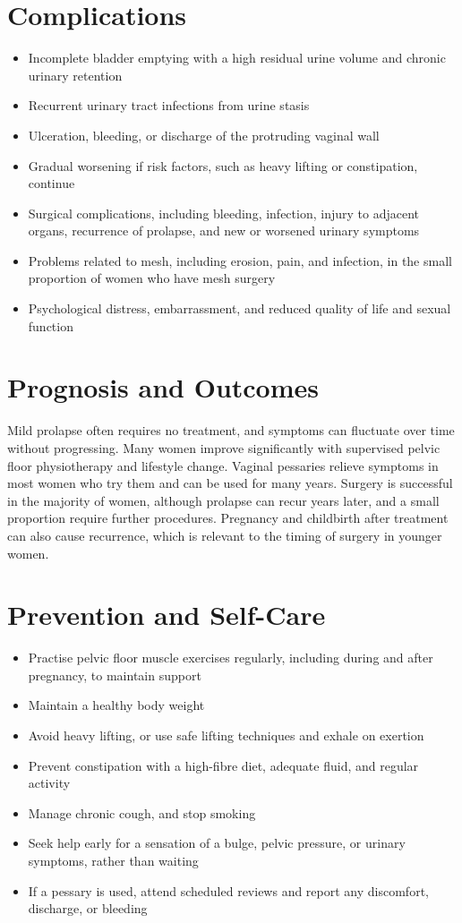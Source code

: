 \section*{Complications}
\begin{itemize}
    \item Incomplete bladder emptying with a high residual urine volume and chronic urinary retention
    \item Recurrent urinary tract infections from urine stasis
    \item Ulceration, bleeding, or discharge of the protruding vaginal wall
    \item Gradual worsening if risk factors, such as heavy lifting or constipation, continue
    \item Surgical complications, including bleeding, infection, injury to adjacent organs, recurrence of prolapse, and new or worsened urinary symptoms
    \item Problems related to mesh, including erosion, pain, and infection, in the small proportion of women who have mesh surgery
    \item Psychological distress, embarrassment, and reduced quality of life and sexual function
\end{itemize}

\section*{Prognosis and Outcomes}
Mild prolapse often requires no treatment, and symptoms can fluctuate over time without progressing. Many women improve significantly with supervised pelvic floor physiotherapy and lifestyle change. Vaginal pessaries relieve symptoms in most women who try them and can be used for many years. Surgery is successful in the majority of women, although prolapse can recur years later, and a small proportion require further procedures. Pregnancy and childbirth after treatment can also cause recurrence, which is relevant to the timing of surgery in younger women.

\section*{Prevention and Self-Care}
\begin{itemize}
    \item Practise pelvic floor muscle exercises regularly, including during and after pregnancy, to maintain support
    \item Maintain a healthy body weight
    \item Avoid heavy lifting, or use safe lifting techniques and exhale on exertion
    \item Prevent constipation with a high-fibre diet, adequate fluid, and regular activity
    \item Manage chronic cough, and stop smoking
    \item Seek help early for a sensation of a bulge, pelvic pressure, or urinary symptoms, rather than waiting
    \item If a pessary is used, attend scheduled reviews and report any discomfort, discharge, or bleeding
\end{itemize}

